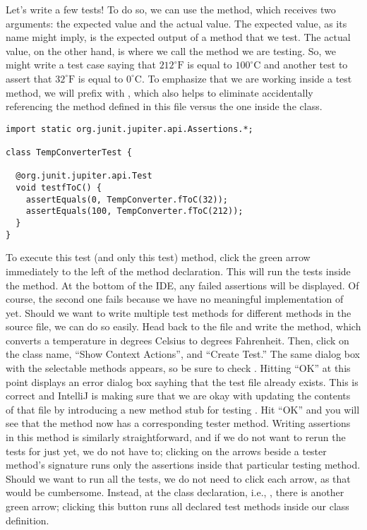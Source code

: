   Let's write a few tests! 
  To do so, we can use the  method, which receives two arguments: the expected value and the actual value. 
  The expected value, as its name might imply, is the expected output of a method that we test. 
  The actual value, on the other hand, is where we call the method we are testing. 
  So, we might write a test case saying that $212^{\circ}\text{F}$ is equal to $100^{\circ}\text{C}$ and another test to assert that $32^{\circ}\text{F}$ is equal to $0^{\circ}\text{C}$. 
  To emphasize that we are working inside a test method, we will prefix  with , which also helps to eliminate accidentally referencing the  method defined in this file versus the one inside the  class.

\begin{lstlisting}[language=MyJava]
import static org.junit.jupiter.api.Assertions.*;

class TempConverterTest {

  @org.junit.jupiter.api.Test
  void testfToC() {
    assertEquals(0, TempConverter.fToC(32));
    assertEquals(100, TempConverter.fToC(212));
  }
}
\end{lstlisting}

To execute this test (and only this test) method, click the green arrow immediately to the left of the method declaration. 
This will run the tests inside the method.
At the bottom of the IDE, any failed assertions will be displayed.
Of course, the second one fails because we have no meaningful implementation of  yet. 
Should we want to write multiple test methods for different methods in the source file, we can do so easily. 
Head back to the  file and write the  method, which converts a temperature in degrees Celsius to degrees Fahrenheit. 
Then, click on the class name, ``Show Context Actions'', and ``Create Test.'' 
The same dialog box with the selectable methods appears, so be sure to check . 
Hitting ``OK'' at this point displays an error dialog box sayhing that the test file already exists. 
This is correct and IntelliJ is making sure that we are okay with updating the contents of that file by introducing a new method stub for testing . 
Hit ``OK'' and you will see that the  method now has a corresponding tester method. 
Writing assertions in this method is similarly straightforward, and if we do not want to rerun the tests for  just yet, we do not have to; clicking on the arrows beside a tester method's signature runs only the assertions inside that particular testing method. 
Should we want to run all the tests, we do not need to click each arrow, as that would be cumbersome. 
Instead, at the class declaration, i.e., , there is another green arrow; clicking this button runs all declared test methods inside our class definition.

